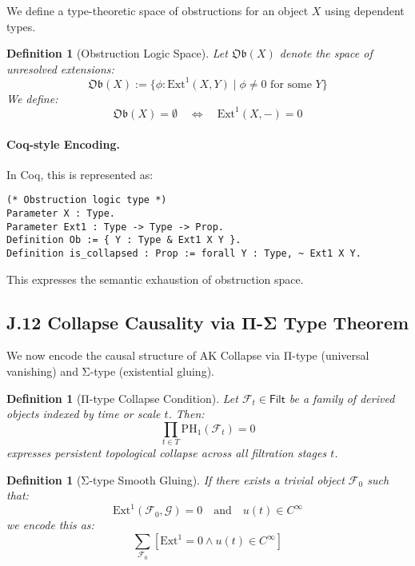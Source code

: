 \documentclass[11pt]{article}
\newtheorem{definition}[theorem]{Definition}
\begin{document}
\begin{axiom}
\begin{axiom}
We define a type-theoretic space of obstructions for an object \(X\) using dependent types.

\begin{definition}[Obstruction Logic Space]
Let \(\mathfrak{Ob}(X)\) denote the space of unresolved extensions:
\[
\mathfrak{Ob}(X) := \{ \phi : \mathrm{Ext}^1(X, Y) \mid \phi \neq 0 \text{ for some } Y \}
\]
We define:
\[
\mathfrak{Ob}(X) = \emptyset \quad \Longleftrightarrow \quad \mathrm{Ext}^1(X, -) = 0
\]
\end{definition}

\paragraph{Coq-style Encoding.}
In Coq, this is represented as:

\begin{verbatim}
(* Obstruction logic type *)
Parameter X : Type.
Parameter Ext1 : Type -> Type -> Prop.
Definition Ob := { Y : Type & Ext1 X Y }.
Definition is_collapsed : Prop := forall Y : Type, ~ Ext1 X Y.
\end{verbatim}

This expresses the semantic exhaustion of obstruction space.


\subsection*{J.12 Collapse Causality via Π-Σ Type Theorem}

We now encode the causal structure of AK Collapse via Π-type (universal vanishing) and Σ-type (existential gluing).

\begin{definition}[Π-type Collapse Condition]
Let \(\mathcal{F}_t \in \mathsf{Filt}\) be a family of derived objects indexed by time or scale \(t\).  
Then:
\[
\prod_{t \in T} \mathrm{PH}_1(\mathcal{F}_t) = 0
\]
expresses persistent topological collapse across all filtration stages \(t\).
\end{definition}

\begin{definition}[Σ-type Smooth Gluing]
If there exists a trivial object \(\mathcal{F}_0\) such that:
\[
\mathrm{Ext}^1(\mathcal{F}_0, \mathcal{G}) = 0 \quad \text{and} \quad u(t) \in C^\infty
\]
we encode this as:
\[
\sum_{\mathcal{F}_0} [\mathrm{Ext}^1 = 0 \wedge u(t) \in C^\infty]
\]
\end{definition}


\end{axiom}
\end{axiom}
\end{document}
